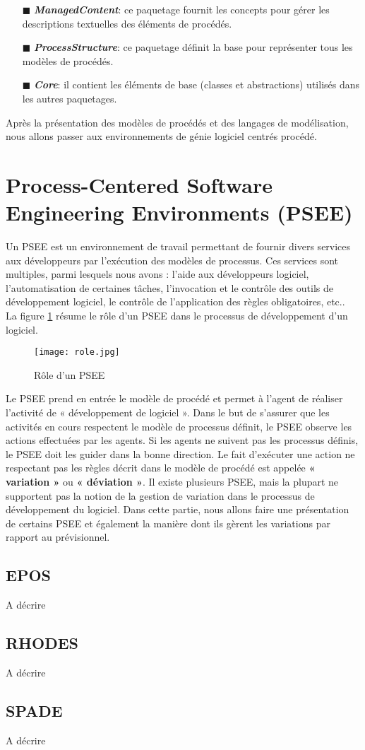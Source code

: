 \begin{itemize}
\begin{itemize}
\begin{itemize}
\item[\tiny{$\blacksquare$}] \textbf{ \textit{ManagedContent}}: ce paquetage fournit les concepts pour gérer les descriptions textuelles des éléments de procédés.
\item[\tiny{$\blacksquare$}] \textbf{ \textit{ProcessStructure}}: ce paquetage définit la base pour représenter tous les modèles de procédés.
\item[\tiny{$\blacksquare$}] \textbf{ \textit{Core}}: il contient les éléments de base (classes et abstractions) utilisés dans les autres paquetages. 
\end{itemize}
\end{itemize} 
\end{itemize}
Après la présentation des modèles de procédés et des langages de modélisation, nous allons passer aux environnements de génie logiciel centrés procédé.
\section{Process-Centered Software Engineering Environments (PSEE)}
Un PSEE est un environnement de travail permettant de fournir divers services aux développeurs par l'exécution des modèles de processus. Ces services sont multiples, parmi lesquels nous avons : l'aide aux développeurs logiciel, l'automatisation de certaines tâches, l'invocation et le contrôle des outils de développement logiciel, le contrôle de l'application des règles obligatoires, etc.\cite{vra}. \\
La figure \ref{rolepsee} résume le rôle d'un PSEE dans le processus de développement d'un logiciel.
\begin{figure}[h]
\centering
\texttt{[image: role.jpg]}
\caption{\label{rolepsee}Rôle d'un PSEE \cite{alm}}
\end{figure}
\clearpage
Le PSEE prend en entrée le modèle de procédé et permet à l'agent de réaliser l'activité de « développement de logiciel ». Dans le but de s'assurer que les activités en cours respectent le modèle de processus définit, le PSEE observe les actions effectuées par les agents. Si les agents ne suivent pas les processus définis, le PSEE doit les guider dans la bonne direction. Le fait d'exécuter une action ne respectant pas les règles décrit dans le modèle de procédé est appelée \textbf{« variation »} ou \textbf{« déviation »}.  
Il existe plusieurs PSEE, mais la plupart ne supportent pas la notion de la gestion de variation dans le processus de développement du logiciel. Dans cette partie, nous allons faire une présentation de certains PSEE et également la manière dont ils gèrent les variations par rapport au prévisionnel.
\subsection*{EPOS}
A décrire
\subsection*{RHODES}
A décrire
\subsection*{SPADE}
A décrire


